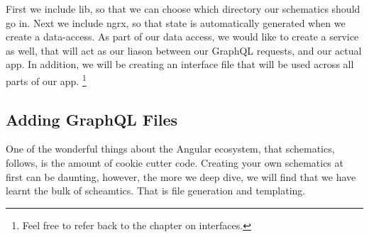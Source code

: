 First we include lib, so that we can choose which directory our schematics
should go in. Next we include ngrx, so that state is automatically generated
when we create a data-access. As part of our data access, we would like to
create a service as well, that will act as our liason between our GraphQL
requests, and our actual app. In addition, we will be creating an interface
file that will be used across all parts of our app. \footnote{Feel free to refer
back to the chapter on interfaces.}

\subsection{ Adding GraphQL Files }
One of the wonderful things about the Angular ecosystem, that schematics,
follows, is the amount of cookie cutter code. Creating your own schematics at
first can be daunting, however, the more we deep dive, we will find that we have
learnt the bulk of scheamtics. That is file generation and templating.
